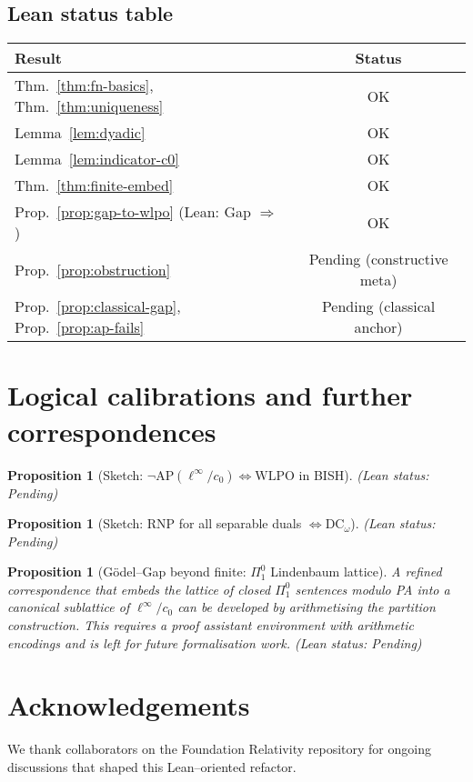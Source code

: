\documentclass[11pt]{article}
\newtheorem{proposition}[theorem]{Proposition}
\theoremstyle{definition}
\newcommand{\linf}{\ell^\infty}
\newcommand{\cnull}{c_0}
\newcommand{\WLPO}{\mathrm{WLPO}}
\newcommand{\DCw}{\mathrm{DC}_\omega}
\newcommand{\leanpending}{\textsf{\small (Lean status: Pending)}}
\begin{document}
\subsection*{Lean status table}
\begin{center}
\begin{tabular}{l c}
\hline
Result & Status \\ \hline
Thm.~\ref{thm:fn-basics}, Thm.~\ref{thm:uniqueness} & OK \\
Lemma~\ref{lem:dyadic} & OK \\
Lemma~\ref{lem:indicator-c0} & OK \\
Thm.~\ref{thm:finite-embed} & OK \\
Prop.~\ref{prop:gap-to-wlpo} (Lean: Gap $\Rightarrow$ \WLPO) & OK \\
Prop.~\ref{prop:obstruction} & Pending (constructive meta) \\
Prop.~\ref{prop:classical-gap}, Prop.~\ref{prop:ap-fails} & Pending (classical anchor) \\
\hline
\end{tabular}
\end{center}

\section{Logical calibrations and further correspondences}\label{app:logic}

\begin{proposition}[Sketch: $\neg\mathrm{AP}(\linf/\cnull)\Longleftrightarrow \WLPO$ in BISH]\leavevmode
\leanpending
\end{proposition}

\begin{proposition}[Sketch: RNP for all separable duals $\Longleftrightarrow \DCw$]\leavevmode
\leanpending
\end{proposition}

\begin{proposition}[Gödel--Gap beyond finite: $\Pi^0_1$ Lindenbaum lattice]\leavevmode

A refined correspondence that embeds the lattice of closed $\Pi^0_1$ sentences modulo PA into
a canonical sublattice of $\linf/\cnull$ can be developed by arithmetising the partition
construction. This requires a proof assistant environment with arithmetic encodings and is left
for future formalisation work. \leanpending
\end{proposition}

\section*{Acknowledgements}
We thank collaborators on the Foundation Relativity repository for ongoing discussions that
shaped this Lean--oriented refactor.
\end{document}
